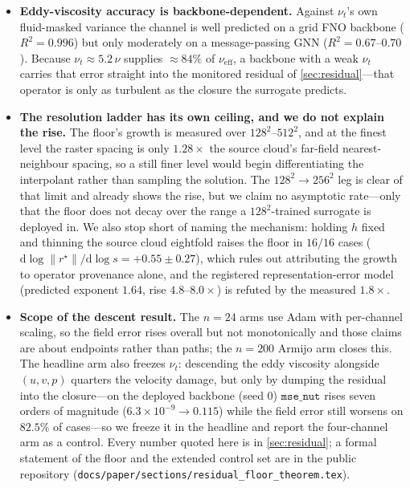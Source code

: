 \begin{itemize}
below one cell, so the \emph{viscous} component of drag is unavailable on this
representation and every drag statement here concerns the pressure-dominated component.
\item \textbf{Eddy-viscosity accuracy is backbone-dependent.} Against $\nu_t$'s own
fluid-masked variance the channel is well predicted on a grid FNO backbone ($R^2 = 0.996$)
but only moderately on a message-passing GNN ($R^2 = 0.67$--$0.70$). Because
$\nu_t\approx5.2\,\nu$ supplies $\approx84\%$ of $\nu_{\mathrm{eff}}$, a backbone with a
weak $\nu_t$ carries that error straight into the monitored residual of
\autoref{sec:residual}---that operator is only as turbulent as the closure the surrogate
predicts.
\item \textbf{The resolution ladder has its own ceiling, and we do not explain the rise.}
The floor's growth is measured over $128^2$--$512^2$, and at the finest level the raster
spacing is only $1.28\times$ the source cloud's far-field nearest-neighbour spacing, so a
still finer level would begin differentiating the interpolant rather than sampling the
solution. The $128^2\!\to\!256^2$ leg is clear of that limit and already shows the rise,
but we claim no asymptotic rate---only that the floor does not decay over the range a
$128^2$-trained surrogate is deployed in. We also stop short of naming the mechanism:
holding $h$ fixed and thinning the source cloud eightfold raises the floor in $16/16$ cases
($\mathrm{d}\log\|r^\star\|/\mathrm{d}\log s=+0.55\pm0.27$), which rules out attributing
the growth to operator provenance alone, and the registered representation-error model
(predicted exponent $1.64$, rise $4.8$--$8.0\times$) is refuted by the measured $1.8\times$.
\item \textbf{Scope of the descent result.} The $n{=}24$ arms use Adam with per-channel
scaling, so the field error rises overall but not monotonically and those claims are about
endpoints rather than paths; the $n{=}200$ Armijo arm closes this. The headline arm also
freezes $\nu_t$: descending the eddy viscosity alongside $(u,v,p)$ quarters the velocity
damage, but only by dumping the residual into the closure---on the deployed backbone
(seed $0$) $\texttt{mse\_nut}$ rises seven orders of magnitude
($6.3\times10^{-9}\to0.115$) while the field error still worsens on $82.5\%$ of cases---so
we freeze it in the headline and report the four-channel arm as a control. Every number
quoted here is in \autoref{sec:residual}; a formal statement of the floor and the extended
control set are in the public repository
(\texttt{docs\slash{}paper\slash{}sections\slash{}residual\_floor\_theorem.tex}).

\end{itemize}
